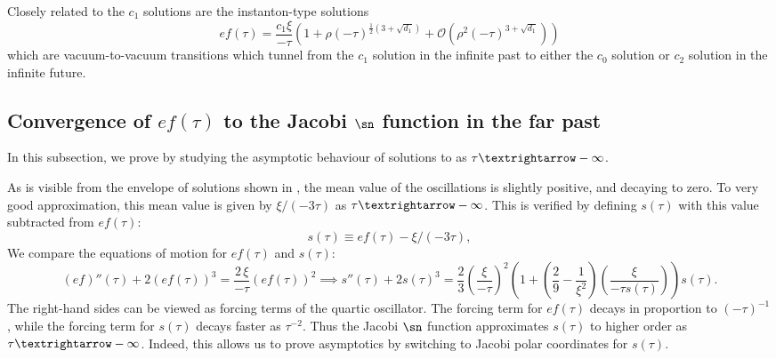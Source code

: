 Closely related to the $c_{1}$ solutions are the instanton-type solutions 
\begin{equation}
ef(\tau)=\frac{c_{1}\xi}{-\tau}\left(1+\rho\left(-\tau\right)^{\tfrac{1}{2}\left(3+\sqrt{d_{1}}\right)}+\mathcal{O}\left(\rho^{2}\left(-\tau\right)^{3+\sqrt{d_{1}}}\right)\right)\label{eq:instanton-type}
\end{equation}
 which are vacuum-to-vacuum transitions which tunnel from the $c_{1}$ solution in the infinite past to either the $c_{0}$ solution or $c_{2}$ solution in the infinite future.

\subsection{\label{app:pf-approx-w}Convergence of \texorpdfstring{$ef(\tau)$}{ef(\tau)} to the Jacobi \texorpdfstring{$\sn$}{sn} function in the far past}

In this subsection, we prove  by studying the asymptotic behaviour of solutions to  as $\tau\textrightarrow-\infty$. 

As is visible from the envelope of solutions shown in , the mean value of the oscillations is slightly positive, and decaying to zero. To very good approximation, this mean value is given by $\xi/(-3\tau)$ as $\tau\textrightarrow-\infty$. This is verified by defining $s(\tau)$ with this value subtracted from $ef(\tau)$: 
\begin{equation}
s(\tau)\equiv ef(\tau)-\xi/(-3\tau),\label{eq:def-s}
\end{equation}
 We compare the equations of motion for $ef(\tau)$ and $s(\tau)$: 
\begin{equation}
(ef)''(\tau)+2\left(ef(\tau)\right)^{3}=\frac{2\,\xi}{-\tau}(ef(\tau))^{2}\implies s''(\tau)+2s(\tau)^{3}=\frac{2}{3}\left(\frac{\xi}{-\tau}\right)^{2}\left(1+\left(\frac{2}{9}-\frac{1}{\xi^{2}}\right)\left(\frac{\xi}{-\tau s(\tau)}\right)\right)s(\tau).\label{eq:s-eom}
\end{equation}
The right-hand sides can be viewed as forcing terms of the quartic oscillator. The forcing term for $ef(\tau)$ decays in proportion to $(-\tau)^{-1}$, while the forcing term for $s(\tau)$ decays faster as $\tau^{-2}$. Thus the Jacobi $\sn$ function approximates $s(\tau)$ to higher order as $\tau\textrightarrow-\infty$. Indeed, this allows us to prove asymptotics by switching to Jacobi polar coordinates for $s(\tau)$. 

